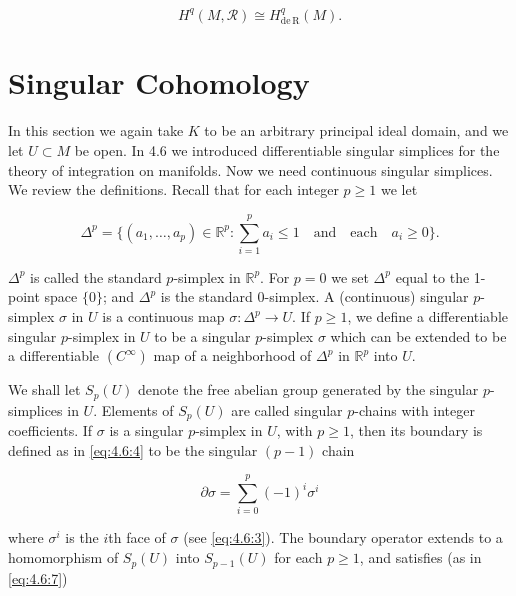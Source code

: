 \begin{equation}
\tag{7}\label{eq:5.30:7}
H^{q}(M,\mathcal{R})\cong H_{\mathrm{de\,R}}^{q}(M).
\end{equation}


\section{Singular Cohomology}


\label{thm:5.31} In this section we again take $K$ to be an arbitrary principal ideal domain, and we let $U \subset M$ be open. In 4.6 we introduced differentiable singular simplices for the theory of integration on manifolds. Now we need continuous singular simplices. We review the definitions. Recall that for each integer $p \geq 1$ we let 

\begin{equation}
\tag{1}\label{eq:5.31:1}
\Delta^{p}=\Big\{(a_{1},\ldots,a_{p})\in\mathbb{R}^{p}\colon\sum_{i=1}^{p}a_{i}\leq1\quad\mathrm{and}\quad\mathrm{each}\quad a_{i}\geq0\Big\}.
\end{equation}

$\Delta^{p}$ is called the standard $p$-simplex in $\mathbb{R}^{p}$. For $p = 0$ we set $\Delta^{p}$ equal to the 1-point space $\{0\}$; and $\Delta^{p}$ is the standard $0$-simplex. A (continuous) singular $p$-simplex $\sigma$ in $U$ is a continuous map $\sigma: \Delta^{p} \to U$. If $p \geq 1$, we define a differentiable singular $p$-simplex in $U$ to be a singular $p$-simplex $\sigma$ which can be extended to be a differentiable $(C^{\infty})$ map of a neighborhood of $\Delta^{p}$ in $\mathbb{R}^{p}$ into $U$.

We shall let $S_{p}(U)$ denote the free abelian group generated by the singular $p$-simplices in $U$. Elements of $S_{p}(U)$ are called singular $p$-chains with integer coefficients. If $\sigma$ is a singular $p$-simplex in $U$, with $p \geq 1$, then its boundary is defined as in \eqref{eq:4.6:4} to be the singular $(p-1)$ chain

\begin{equation}
\tag{2}\label{eq:5.31:2}
\partial\sigma=\sum_{i=0}^{p}(-1)^{i}\sigma^{i}
\end{equation}

where  $ \sigma^{i} $ is the  $ i $th face of  $ \sigma $ (see \eqref{eq:4.6:3}). The boundary operator extends to a homomorphism of  $ S_{p}(U) $ into  $ S_{p-1}(U) $ for each  $ p \geq 1 $, and satisfies (as in \eqref{eq:4.6:7})

